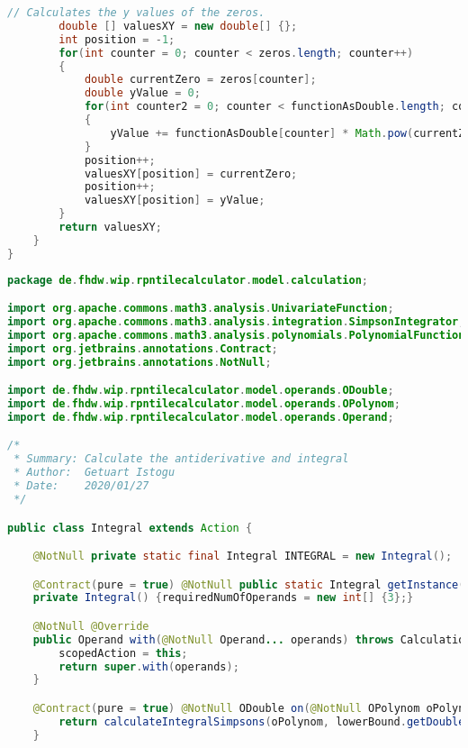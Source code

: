 \begin{lstlisting}[caption=HighAndLowPoints (Keienburg),label=list:HighAndLowPoints,language=Java]
        // Calculates the y values of the zeros.
        double [] valuesXY = new double[] {};
        int position = -1;
        for(int counter = 0; counter < zeros.length; counter++)
        {
            double currentZero = zeros[counter];
            double yValue = 0;
            for(int counter2 = 0; counter < functionAsDouble.length; counter2++)
            {
                yValue += functionAsDouble[counter] * Math.pow(currentZero,(functionAsDouble.length - counter2 - 1));
            }
            position++;
            valuesXY[position] = currentZero;
            position++;
            valuesXY[position] = yValue;
        }
        return valuesXY;
    }
}
\end{lstlisting}    

\begin{lstlisting}[caption=Integral (Istogu),label=list:Integral,language=Java]
package de.fhdw.wip.rpntilecalculator.model.calculation;

import org.apache.commons.math3.analysis.UnivariateFunction;
import org.apache.commons.math3.analysis.integration.SimpsonIntegrator;
import org.apache.commons.math3.analysis.polynomials.PolynomialFunction;
import org.jetbrains.annotations.Contract;
import org.jetbrains.annotations.NotNull;

import de.fhdw.wip.rpntilecalculator.model.operands.ODouble;
import de.fhdw.wip.rpntilecalculator.model.operands.OPolynom;
import de.fhdw.wip.rpntilecalculator.model.operands.Operand;

/*
 * Summary: Calculate the antiderivative and integral
 * Author:  Getuart Istogu
 * Date:    2020/01/27
 */

public class Integral extends Action {

    @NotNull private static final Integral INTEGRAL = new Integral();

    @Contract(pure = true) @NotNull public static Integral getInstance() { return INTEGRAL; }
    private Integral() {requiredNumOfOperands = new int[] {3};}

    @NotNull @Override
    public Operand with(@NotNull Operand... operands) throws CalculationException {
        scopedAction = this;
        return super.with(operands);
    }

    @Contract(pure = true) @NotNull ODouble on(@NotNull OPolynom oPolynom, @NotNull ODouble lowerBound, @NotNull ODouble upperBound) {
        return calculateIntegralSimpsons(oPolynom, lowerBound.getDouble(), upperBound.getDouble());
    }
    

\end{lstlisting}
